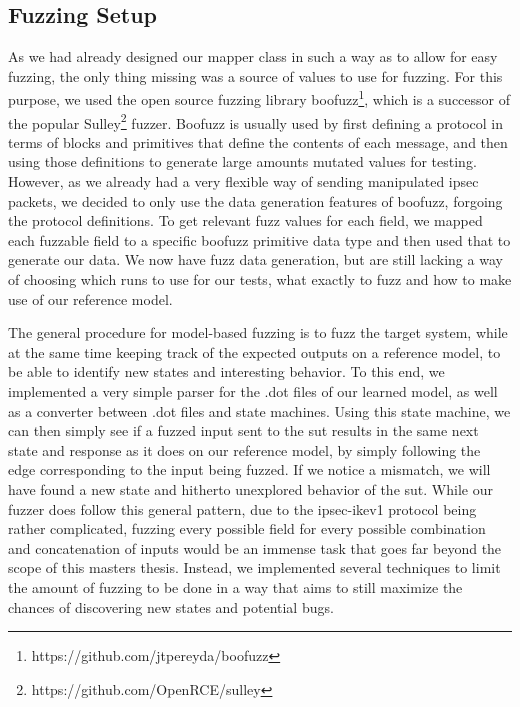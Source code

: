 \subsection{Fuzzing Setup} \label{subsec:fuzz_setup}
As we had already designed our mapper class in such a way as to allow for easy fuzzing, the only thing missing was a source of values to use for fuzzing. For this purpose, we used the open source fuzzing library boofuzz\footnote{https://github.com/jtpereyda/boofuzz}, which is a successor of the popular Sulley\footnote{https://github.com/OpenRCE/sulley} fuzzer. Boofuzz is usually used by first defining a protocol in terms of blocks and primitives that define the contents of each message, and then using those definitions to generate large amounts mutated values for testing. However, as we already had a very flexible way of sending manipulated \ac{ipsec} packets, we decided to only use the data generation features of boofuzz, forgoing the protocol definitions. To get relevant fuzz values for each field, we mapped each fuzzable field to a specific boofuzz primitive data type and then used that to generate our data. We now have fuzz data generation, but are still lacking a way of choosing which runs to use for our tests, what exactly to fuzz and how to make use of our reference model.

The general procedure for model-based fuzzing is to fuzz the target system, while at the same time keeping track of the expected outputs on a reference model, to be able to identify new states and interesting behavior. To this end, we implemented a very simple parser for the .dot files of our learned model, as well as a converter between .dot files and state machines. Using this state machine, we can then simply see if a fuzzed input sent to the \ac{sut} results in the same next state and response as it does on our reference model, by simply following the edge corresponding to the input being fuzzed. If we notice a mismatch, we will have found a new state and hitherto unexplored behavior of  the \ac{sut}. While our fuzzer does follow this general pattern, due to the \ac{ipsec}-\ac{ike}v1 protocol being rather complicated, fuzzing every possible field for every possible combination and concatenation of inputs would be an immense task that goes far beyond the scope of this masters thesis. Instead, we implemented several techniques to limit the amount of fuzzing to be done in a way that aims to still maximize the chances of discovering new states and potential bugs. 

